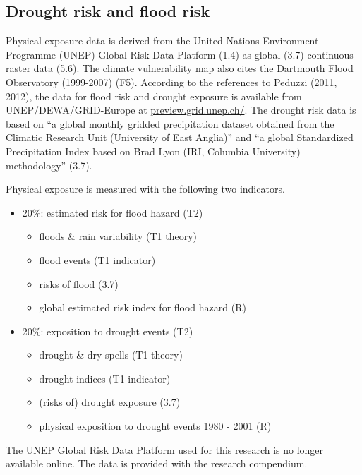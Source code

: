 \documentclass[
]{article}
\providecommand{\tightlist}{%
  \setlength{\itemsep}{0pt}\setlength{\parskip}{0pt}}
\begin{document}
\hypertarget{drought-risk-and-flood-risk}{%
\subsection{Drought risk and flood
risk}\label{drought-risk-and-flood-risk}}

Physical exposure data is derived from the United Nations Environment
Programme (UNEP) Global Risk Data Platform (1.4) as global (3.7)
continuous raster data (5.6). The climate vulnerability map also cites
the Dartmouth Flood Observatory (1999-2007) (F5). According to the
references to Peduzzi (2011, 2012), the data for flood risk and drought
exposure is available from UNEP/DEWA/GRID-Europe at
\href{http://preview.grid.unep.ch/}{preview.grid.unep.ch/}. The drought
risk data is based on ``a global monthly gridded precipitation dataset
obtained from the Climatic Research Unit (University of East Anglia)''
and ``a global Standardized Precipitation Index based on Brad Lyon (IRI,
Columbia University) methodology'' (3.7).

Physical exposure is measured with the following two indicators.

\begin{itemize}
\tightlist
\item
  20\%: estimated risk for flood hazard (T2)

  \begin{itemize}
  \tightlist
  \item
    floods \& rain variability (T1 theory)
  \item
    flood events (T1 indicator)
  \item
    risks of flood (3.7)
  \item
    global estimated risk index for flood hazard (R)
  \end{itemize}
\item
  20\%: exposition to drought events (T2)

  \begin{itemize}
  \tightlist
  \item
    drought \& dry spells (T1 theory)
  \item
    drought indices (T1 indicator)
  \item
    (risks of) drought exposure (3.7)
  \item
    physical exposition to drought events 1980 - 2001 (R)
  \end{itemize}
\end{itemize}

The UNEP Global Risk Data Platform used for this research is no longer
available online. The data is provided with the research compendium.
\end{document}
